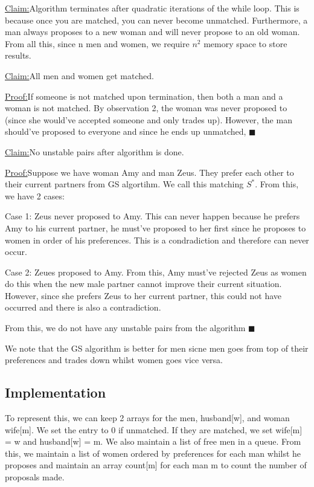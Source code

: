 \documentclass[11pt, oneside]{article}
\theoremstyle{definition}
\newenvironment{claim}[1]{\par\noindent\underline{Claim:}\space#1}{}
\newenvironment{claimproof}[1]{\par\noindent\underline{Proof:}\space#1}{\hfill $\blacksquare$}
\begin{document}
\begin{claim} Algorithm terminates after quadratic iterations of the while loop. This is because once you are matched, you can never become unmatched. Furthermore, a man always proposes to a new woman and will never propose to an old woman.
\end{claim}
 From all this, since n men and women, we require $n^2$ memory space to store results.
\begin{claim}
  All men and women get matched.
\end{claim}
\begin{claimproof}
  If someone is not matched upon termination, then both a man and a woman is not matched. By observation 2, the woman was never proposed to (since she would've accepted someone and only trades up). However, the man should've proposed to everyone and since he ends up unmatched,
\end{claimproof}
\begin{claim}
  No unstable pairs after algorithm is done.
\end{claim}
\begin{claimproof}
  Suppose we have woman Amy and man Zeus. They prefer each other to their current partners from GS algortihm. We call this matching $S^*$. From this, we have 2 cases:

  \quad Case 1: Zeus never proposed to Amy. This can never happen because he prefers Amy to his current partner, he must've proposed to her first since he proposes to women in order of his preferences. This is a condradiction and therefore can never occur.

  \quad Case 2: Zeues proposed to Amy. From this, Amy must've rejected Zeus as women do this when the new male partner cannot improve their current situation. However, since she prefers Zeus to her current partner, this could not have occurred and there is also a contradiction.

  From this, we do not have any unstable pairs from the algorithm
\end{claimproof}

We note that the GS algorithm is better for men sicne men goes from top of their preferences and trades down whilst women goes vice versa.

\subsection{Implementation}
To represent this, we can keep 2 arrays for the men, husband[w], and woman wife[m]. We set the entry to 0 if unmatched. If they are matched, we set wife[m] = w and husband[w] = m. We also maintain a list of free men in a queue. From this, we maintain a list of women ordered by preferences for each man whilst he proposes and maintain an array count[m] for each man m to count the number of proposals made.
\end{document}
